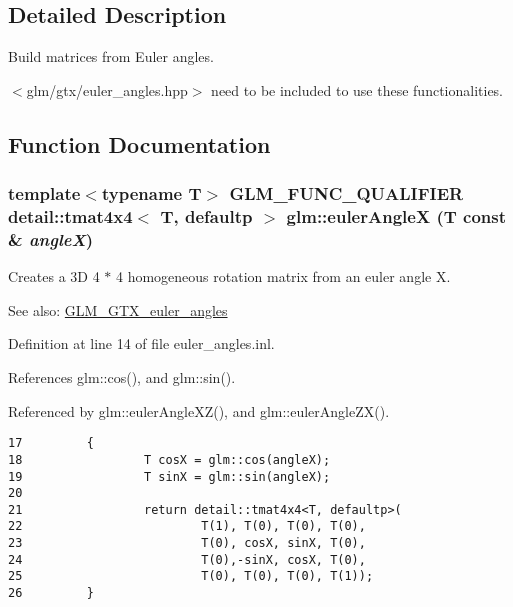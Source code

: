 \subsection{Detailed Description}
Build matrices from Euler angles. 

$<$glm/gtx/euler\_\-angles.hpp$>$ need to be included to use these functionalities. 

\subsection{Function Documentation}
\hypertarget{group__gtx__euler__angles_g5fb8269b6795f95dec7ca7bbe61805f6}{
\subsubsection[eulerAngleX]{\setlength{\rightskip}{0pt plus 5cm}template$<$typename T$>$ GLM\_\-FUNC\_\-QUALIFIER detail::tmat4x4$<$ T, defaultp $>$ glm::eulerAngleX (T const \& {\em angleX})}}
\label{group__gtx__euler__angles_g5fb8269b6795f95dec7ca7bbe61805f6}


Creates a 3D 4 $\ast$ 4 homogeneous rotation matrix from an euler angle X. \begin{Desc}
\item[See also:]\hyperlink{group__gtx__euler__angles}{GLM\_\-GTX\_\-euler\_\-angles} \end{Desc}


Definition at line 14 of file euler\_\-angles.inl.

References glm::cos(), and glm::sin().

Referenced by glm::eulerAngleXZ(), and glm::eulerAngleZX().

\begin{Code}\begin{verbatim}17         {
18                 T cosX = glm::cos(angleX);
19                 T sinX = glm::sin(angleX);
20         
21                 return detail::tmat4x4<T, defaultp>(
22                         T(1), T(0), T(0), T(0),
23                         T(0), cosX, sinX, T(0),
24                         T(0),-sinX, cosX, T(0),
25                         T(0), T(0), T(0), T(1));
26         }
\end{verbatim}
\end{Code}




